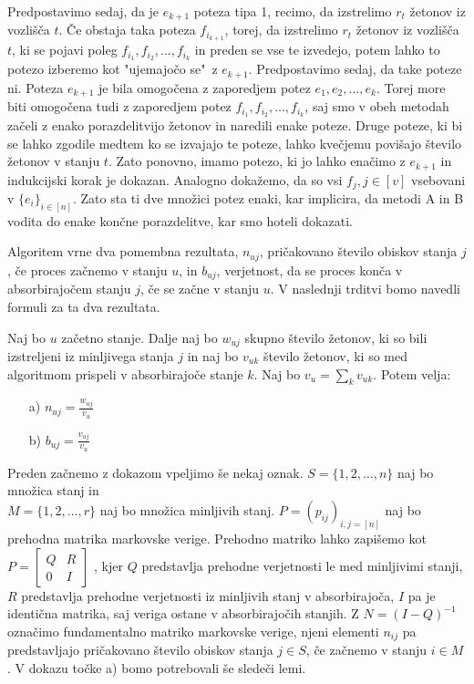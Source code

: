 \documentclass[twoside,11pt]{article}
\begin{document}
Predpostavimo sedaj, da je $e_{k+1}$ poteza tipa 1, recimo, da izstrelimo $r_{t}$ žetonov iz vozlišča $t$. Če obstaja taka poteza $f_{i_{k+1}}$, torej, da izstrelimo $r_{t}$ žetonov iz vozlišča $t$, ki se pojavi poleg $f_{i_1},f_{i_2},\ldots,f_{i_k}$ in preden se vse te izvedejo, potem lahko to potezo izberemo kot "ujemajočo se" \,z $e_{k+1}$. Predpostavimo sedaj, da take poteze ni. Poteza $e_{k+1}$ je bila omogočena z zaporedjem potez $e_{1},e_{2},\ldots,e_{k}$. Torej more biti omogočena tudi z zaporedjem potez $f_{i_1},f_{i_2},\ldots,f_{i_k}$, saj smo v obeh metodah začeli z enako porazdelitvijo žetonov in naredili enake poteze. Druge poteze, ki bi se lahko zgodile medtem ko se izvajajo te poteze, lahko kvečjemu povišajo število žetonov v stanju $t$. 
Zato ponovno, imamo potezo, ki jo lahko enačimo z $e_{k+1}$ in indukcijski korak je dokazan. Analogno dokažemo, da so vsi $f_{j}, j \in [v] $ vsebovani v $\{e_{i} \}_{i\in [n] }$. Zato sta ti dve množici potez enaki, kar implicira, da metodi A in B vodita do enake končne porazdelitve, kar smo hoteli dokazati.
\hfill \QED

\vspace{\baselineskip}

Algoritem vrne dva pomembna rezultata, $n_{uj}$, pričakovano število obiskov stanja $j$, če proces začnemo v stanju $u$, in $b_{uj}$, verjetnost, da se proces konča v absorbirajočem stanju $j$, če se začne v stanju $u$. V naslednji trditvi bomo navedli formuli za ta dva rezultata.

\begin{trditev}\label{formule}
    Naj bo $u$ začetno stanje. Dalje naj bo $w_{uj}$ skupno število žetonov, ki so bili izstreljeni iz minljivega stanja $j$ in naj bo $v_{uk}$ število žetonov, ki so med algoritmom prispeli v absorbirajoče stanje $k$. Naj bo $v_{u} = \sum_{k} v_{uk}$. Potem velja: 
    \begin{enumerate}
        \item[a)] $n_{uj} = \frac{w_{uj}}{v_{u}}$
        \item[b)] $b_{uj} = \frac{v_{uj}}{v_{u}}$
    \end{enumerate}

\end{trditev}


\noindent
Preden začnemo z dokazom vpeljimo še nekaj oznak. $S = \{1,2,\ldots,n\}$ naj bo množica stanj in \\ $M = \{1,2,\ldots,r\}$ naj bo množica minljivih stanj. $P = (p_{ij})_{i,j=[n]}$ naj bo prehodna matrika markovske verige. Prehodno matriko lahko zapišemo kot 
$ P =
\begin{bmatrix} 
    Q & R \\
    0 & I 
\end{bmatrix}
$
    , kjer $Q$ predstavlja prehodne verjetnosti le med minljivimi stanji, $R$ predstavlja prehodne verjetnosti iz minljivih stanj v absorbirajoča, $I$ pa je identična matrika, saj veriga ostane v absorbirajočih stanjih. Z $N = (I-Q)^{-1}$ označimo fundamentalno matriko markovske verige, njeni elementi $n_{ij}$  pa predstavljajo pričakovano število obiskov stanja $j\in S$, če začnemo v stanju $i\in M$. V dokazu točke a) bomo potrebovali še sledeči lemi.  
\smallskip
\end{document}
